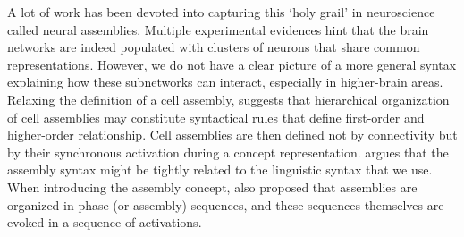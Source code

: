     A lot of work has been devoted into capturing this `holy grail' in
    neuroscience called neural assemblies. Multiple experimental evidences hint
    that the brain networks are indeed populated with clusters of neurons that
    share common representations. However, we do not have a clear picture of a
    more general syntax explaining how these subnetworks can interact,
    especially in higher-brain areas. Relaxing the definition of a cell
    assembly, \cite{Buzsaki2010} suggests that hierarchical organization of
    cell assemblies may constitute syntactical rules that define first-order
    and higher-order relationship. Cell assemblies are then defined not by
    connectivity but by their synchronous activation during a concept
    representation. \cite{Pulvermuller2010} argues that the assembly syntax
    might be tightly related to the linguistic syntax that we use. When
    introducing the assembly concept, \cite{Hebb49} also proposed that
    assemblies are organized in phase (or assembly) sequences, and these
    sequences themselves are evoked in a sequence of activations.


 

  






